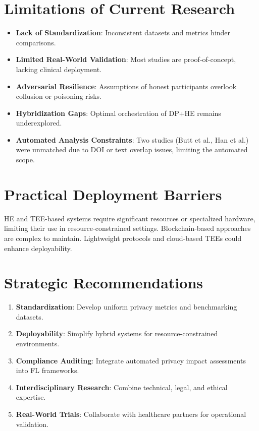 \documentclass[12pt]{report}
\begin{document}
{\section{Limitations of Current Research}
\begin{itemize}
    \item \textbf{Lack of Standardization}: Inconsistent datasets and metrics hinder comparisons.
    \item \textbf{Limited Real-World Validation}: Most studies are proof-of-concept, lacking clinical deployment.
    \item \textbf{Adversarial Resilience}: Assumptions of honest participants overlook collusion or poisoning risks.
    \item \textbf{Hybridization Gaps}: Optimal orchestration of DP+HE remains underexplored.
    \item \textbf{Automated Analysis Constraints}: Two studies (Butt et al., Han et al.) were unmatched due to DOI or text overlap issues, limiting the automated scope.
\end{itemize}

\section{Practical Deployment Barriers}
HE and TEE-based systems require significant resources or specialized hardware, limiting their use in resource-constrained settings. Blockchain-based approaches are complex to maintain. Lightweight protocols and cloud-based TEEs could enhance deployability.

\section{Strategic Recommendations}
\begin{enumerate}
    \item \textbf{Standardization}: Develop uniform privacy metrics and benchmarking datasets.
    \item \textbf{Deployability}: Simplify hybrid systems for resource-constrained environments.
    \item \textbf{Compliance Auditing}: Integrate automated privacy impact assessments into FL frameworks.
    \item \textbf{Interdisciplinary Research}: Combine technical, legal, and ethical expertise.
    \item \textbf{Real-World Trials}: Collaborate with healthcare partners for operational validation.
\end{enumerate}

}
\end{document}
